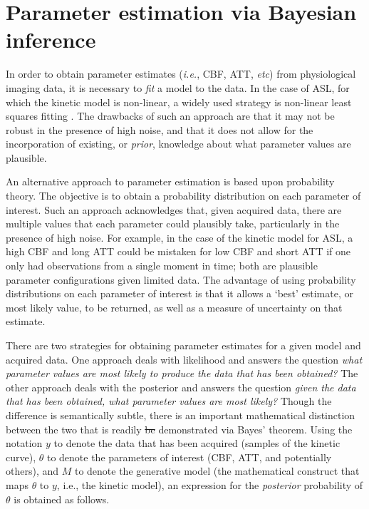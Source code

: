 \documentclass[12pt]{report}
\providecommand{\DIFdeltex}[1]{{\protect\color{red}\sout{#1}}}                      %
\providecommand{\DIFdelbegin}{} %
\providecommand{\DIFdelend}{} %
\providecommand{\DIFdel}[1]{\texorpdfstring{\DIFdeltex{#1}}{}} %
\newcommand{\DIFscaledelfig}{0.5}
\newlength{\DIFdelgraphicswidth} %
\newlength{\DIFdelgraphicsheight} %
\newcommand{\DIFdelincludegraphics}[2][]{%
\sbox{\DIFdelgraphicsbox}{\DIFOincludegraphics[#1]{#2}}%
\settoboxwidth{\DIFdelgraphicswidth}{\DIFdelgraphicsbox} %
\settoboxtotalheight{\DIFdelgraphicsheight}{\DIFdelgraphicsbox} %
\scalebox{\DIFscaledelfig}{%
\parbox[b]{\DIFdelgraphicswidth}{\usebox{\DIFdelgraphicsbox}\\[-\baselineskip] \rule{\DIFdelgraphicswidth}{0em}}\llap{\resizebox{\DIFdelgraphicswidth}{\DIFdelgraphicsheight}{%
\setlength{\unitlength}{\DIFdelgraphicswidth}%
\begin{picture}(1,1)%
\thicklines\linethickness{2pt} %
{\color[rgb]{1,0,0}\put(0,0){\framebox(1,1){}}}%
{\color[rgb]{1,0,0}\put(0,0){\line( 1,1){1}}}%
{\color[rgb]{1,0,0}\put(0,1){\line(1,-1){1}}}%
\end{picture}%
}\hspace*{3pt}}} %
} %
\DeclareRobustCommand{\DIFdelbegin}{\DIFOdelbegin \let\includegraphics\DIFdelincludegraphics} %
\DeclareRobustCommand{\DIFdelend}{\DIFOaddend \let\includegraphics\DIFOincludegraphics} %
\begin{document}
\section{Parameter estimation via Bayesian inference}
\label{lit_vb}

In order to obtain parameter estimates (\textit{i.e.}, CBF, ATT, \textit{etc}) from physiological imaging data, it is necessary to \textit{fit} a model to the data. In the case of ASL, for which the kinetic model is non-linear, a widely used strategy is non-linear least squares fitting \cite{Chappell2009}. The drawbacks of such an approach are that it may not be robust in the presence of high noise, and that it does not allow for the incorporation of existing, or \textit{prior}, knowledge about what parameter values are plausible. 

An alternative approach to parameter estimation is based upon probability theory. The objective is to obtain a probability distribution on each parameter of interest. Such an approach acknowledges that, given acquired data, there are multiple values that each parameter could plausibly take, particularly in the presence of high noise. For example, in the case of the kinetic model for ASL, a high CBF and long ATT could be mistaken for low CBF and short ATT if one only had observations from a single moment in time; both are plausible parameter configurations given limited data. The advantage of using probability distributions on each parameter of interest is that it allows a `best' estimate, or most likely value, to be returned, as well as a measure of uncertainty on that estimate. 

There are two strategies for obtaining parameter estimates for a given model and acquired data. One approach deals with likelihood and answers the question \textit{what parameter values are most likely to produce the data that has been obtained?} The other approach deals with the posterior and answers the question \textit{given the data that has been obtained, what parameter values are most likely?} Though the difference is semantically subtle, there is an important mathematical distinction between the two that is readily \DIFdelbegin \DIFdel{be }\DIFdelend demonstrated via Bayes' theorem. Using the notation $y$ to denote the data that has been acquired (samples of the kinetic curve), $\theta$ to denote the parameters of interest (CBF, ATT, and potentially others), and $M$ to denote the generative model (the mathematical construct that maps $\theta$ to $y$, i.e., the kinetic model), an expression for the \textit{posterior} probability of $\theta$ is obtained as follows. 
\end{document}
